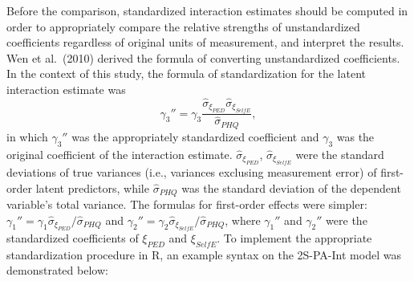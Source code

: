 \documentclass[
  man]{apa7}
\begin{document}
Before the comparison, standardized interaction estimates should be computed in order to appropriately compare the relative strengths of unstandardized coefficients regardless of original units of measurement, and interpret the results. Wen et al.~(2010) derived the formula of converting unstandardized coefficients. In the context of this study, the formula of standardization for the latent interaction estimate was
\begin{equation}
\gamma_{3}'' = \gamma_{3} \frac{\hat{\sigma}_{\xi_{PED}}\hat{\sigma}_{\xi_{SelfE}}}{\hat{\sigma}_{PHQ}},
\end{equation}
in which \(\gamma_{3}''\) was the appropriately standardized coefficient and \(\gamma_{3}\) was the original coefficient of the interaction estimate. \(\hat{\sigma}_{\xi_{PED}}\), \(\hat{\sigma}_{\xi_{SelfE}}\) were the standard deviations of true variances (i.e., variances exclusing measurement error) of first-order latent predictors, while \(\hat{\sigma}_{PHQ}\) was the standard deviation of the dependent variable's total variance. The formulas for first-order effects were simpler: \(\gamma_{1}'' = \gamma_{1}\hat{\sigma}_{\xi_{PED}}/\hat{\sigma}_{PHQ}\) and \(\gamma_{2}'' = \gamma_{2}\hat{\sigma}_{\xi_{SelfE}}/\hat{\sigma}_{PHQ}\), where \(\gamma_{1}''\) and \(\gamma_{2}''\) were the standardized coefficients of \(\xi_{PED}\) and \(\xi_{SelfE}\).
To implement the appropriate standardization procedure in R, an example syntax on the 2S-PA-Int model was demonstrated below:
\end{document}
